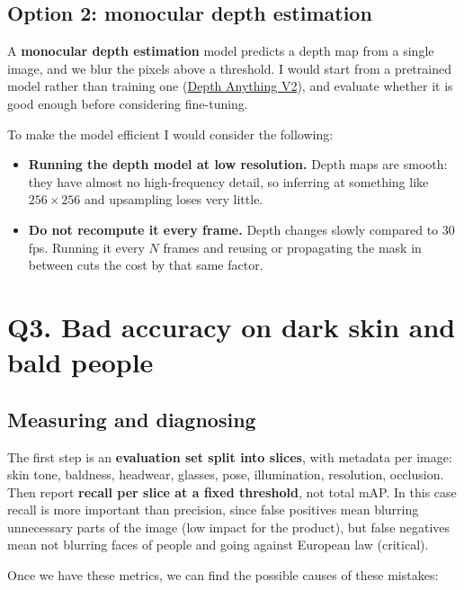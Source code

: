 \documentclass[11pt,a4paper]{article}
\begin{document}
\subsection*{Option 2: monocular depth estimation}

A \textbf{monocular depth estimation} model predicts a depth map from a single image, and
we blur the pixels above a threshold. I would start from a pretrained model rather than
training one (\href{https://arxiv.org/abs/2406.09414}{Depth Anything V2}), and evaluate whether it is good enough before considering fine-tuning.

To make the model efficient I would consider the following:

\begin{itemize}
  \item \textbf{Running the depth model at low resolution.} Depth maps are smooth: they
    have almost no high-frequency detail, so inferring at something like $256\times256$ and
    upsampling loses very little.
  \item \textbf{Do not recompute it every frame.} Depth changes slowly compared to 30\,fps.
    Running it every $N$ frames and reusing or propagating the mask in between cuts the cost
    by that same factor.
\end{itemize}

\section*{Q3. Bad accuracy on dark skin and bald people}

\subsection*{Measuring and diagnosing}

The first step is
an \textbf{evaluation set split into slices}, with metadata per image: skin tone, baldness, headwear, glasses,
pose, illumination, resolution, occlusion. Then report \textbf{recall per slice at a fixed
threshold}, not total mAP. In this case recall is more important than precision, since false positives mean blurring unnecessary parts of the image (low impact for the product), but false negatives mean not blurring faces of people and going against European law (critical). 

Once we have these metrics, we can find the possible causes of these mistakes:
\end{document}
